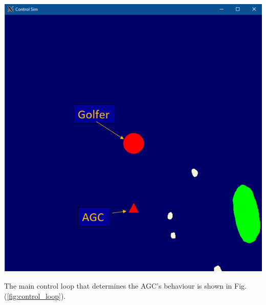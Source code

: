 \documentclass[11pt,landscape]{article}
\newenvironment{Figure}
  {\par\medskip\noindent\minipage{\linewidth}}
  {\endminipage\par\medskip}
\begin{document}
\begin{multicols}{3}
\begin{Figure}
    \begin{center}
        \includegraphics[width=\textwidth]{simulator.png}
    \end{center}
    \label{fig:simulator}
\end{Figure}
\vfill\null
\columnbreak
The main control loop that determines the AGC's behaviour is shown in Fig.
(\ref{fig:control_loop}).
\begin{Figure}
\begin{mdframed}
    \begin{center}

\end{center}
\end{mdframed}
\end{Figure}
\end{multicols}
\end{document}
